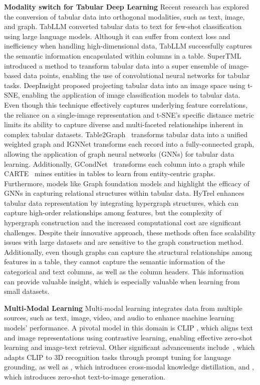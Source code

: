 \noindent \textbf{Modality switch for Tabular Deep Learning} Recent research has explored the conversion of tabular data into orthogonal modalities, such as text, image, and graph. 
TabLLM \cite{tabllm} converted tabular data to text for few-shot classification using large language models. Although it can suffer from context loss and inefficiency when handling high-dimensional data, TabLLM successfully captures the semantic information encapsulated within columns in a table.
SuperTML \cite{wang2019supertml} introduced a method to transform tabular data into a super ensemble of image-based data points, enabling the use of convolutional neural networks for tabular tasks. DeepInsight \cite{DeepInsight} proposed projecting tabular data into an image space using t-SNE, enabling the application of image classification models to tabular data. Even though this technique effectively captures underlying feature correlations, the reliance on a single-image representation and t-SNE's specific distance metric limits its ability to capture diverse and multi-faceted relationships inherent in complex tabular datasets. 
Table2Graph~\cite{huang22table2graph} transforms tabular data into a unified weighted graph and IGNNet \cite{ignnet} transforms each record into a fully-connected graph, allowing the application of graph neural networks (GNNs) for tabular data learning. 
Additionally, GCondNet~\cite{margeloiu2023gcondnet} transforms each column into a graph while CARTE~\cite{kim2024carte} mines entities in tables to learn from entity-centric graphs.
Furthermore, models like Graph foundation models \cite{galkin2024towards, zhang2024gnn} and \cite{sun2023gpt} highlight the efficacy of GNNs in capturing relational structures within tabular data.  
HyTrel \cite{chen2023hytrel} enhances tabular data representation by integrating hypergraph structures, which can capture high-order relationships among features, but the complexity of hypergraph construction and the increased computational cost are significant challenges.
Despite their innovative approach, these methods often face scalability issues with large datasets and are sensitive to the graph construction method. Additionally, even though graphs can capture the structural relationships among features in a table, they cannot capture the semantic information of the categorical and text columns, as well as the column headers. This information can provide valuable insight, which is especially valuable when learning from small datasets. 

\noindent \textbf{Multi-Modal Learning}
Multi-modal learning integrates data from multiple sources, such as text, image, video, and audio to enhance machine learning models' performance. A pivotal model in this domain is CLIP \cite{radford2021learning}, which aligns text and image representations using contrastive learning, enabling effective zero-shot learning and image-text retrieval. Other significant advancements include~\cite{hegde2023clip3d}, which adapts CLIP to 3D recognition tasks through prompt tuning for language grounding, as well as \cite{Chen_2023}, which introduces cross-modal knowledge distillation, and \cite{ramesh2021zero}, which introduces zero-shot text-to-image generation.

